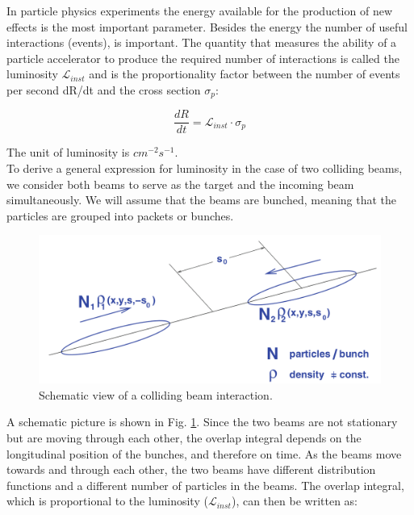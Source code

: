 In particle physics experiments the energy available for the production of new effects is the most important parameter. Besides the energy the number of useful interactions (events), is important. The quantity that measures the ability of a particle accelerator to produce the required number of interactions is called the luminosity $\mathcal{L}_{inst}$ and is the proportionality factor between the number of
events per second dR/dt and the cross section $\sigma_{p}$\cite{ref_lib_vol3}:

\begin{equation}
\frac{dR}{dt}=\mathcal{L}_{inst} \cdot \sigma_{p}
\end{equation}

The unit of luminosity is $cm^{-2}s^{-1}$.\\

To derive a general expression for luminosity in the case of two colliding beams, we consider both beams to serve as the target and the incoming beam simultaneously. We will assume that the beams are bunched, meaning that the particles are grouped into packets or bunches. 

\begin{center}
  \begin{figure}[h!]
    \centering
\includegraphics[scale=.25]{Chapter1/luminosity.png} 
 \caption[Colliding beam interaction]{Schematic view of a colliding beam interaction\cite{thomson_2013}.}
    \label{luminosity}
  \end{figure}
\end{center}

A schematic picture is shown in Fig. \ref{luminosity}. Since the two beams are not stationary but are moving through each other, the overlap integral depends on the longitudinal position of the bunches, and therefore on time. As the beams move towards and through each other, the two beams have different distribution functions and a different number of particles in the beams. The overlap integral, which is proportional to the luminosity ($\mathcal{L}_{inst}$), can then be written as:
 
